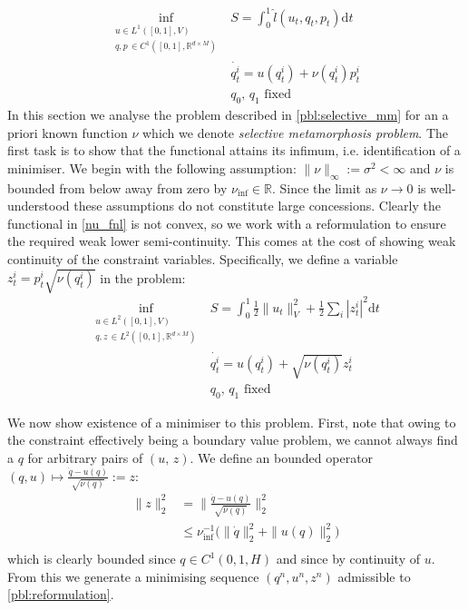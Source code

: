 \documentclass[runningheads]{llncs}
\newcommand{\half}{\frac 12}
\newcommand{\norm}[2]{\| #1 \|_{ #2 }}
\newcommand{\vnorm}[1]{\norm{ #1 }{V}}
\newcommand{\ltwonorm}[1]{\norm{ #1 }{2}}
\newcommand{\diff}[1]{\text{d} #1}
\newcommand{\RdM}{\mathbb{R}^{d\times M}}
\newcommand{\nuinf}{\nu_\text{inf}}
\begin{document}
\begin{align}
\inf_{\substack{u \in L^1([0,1],V)\\ q, p\, \in C^1([0,1],\RdM)}} & S = \int_0^1 \hat l(u_t, q_t, p_t)\diff{t}\label{nu_fnl}\\
& \dot{q_t^i} =  u(q_t^i) + \nu(q^i_t)p^i_t \\
    & q_0,\,q_1\text{ fixed}
  \label{pbl:selective_mm}
\end{align}
In this section we analyse the problem described in \eqref{pbl:selective_mm} for
an a priori known function $\nu$ which we denote \emph{selective metamorphosis
problem}. The first task is to show that the functional attains its infimum,
i.e. identification of a minimiser. We begin with the following assumption:
$\|\nu\|_\infty := \sigma^2 <\infty$ and $\nu$ is bounded from below
away from zero by $\nuinf \in \mathbb R$.
  \label{assumption:nu_bounded}
Since the limit as $\nu\rightarrow 0$ is well-understood these assumptions do
not constitute large concessions. Clearly the functional in \eqref{nu_fnl} is
not convex, so we work with a reformulation to ensure the required weak lower
semi-continuity. This comes at the cost of showing weak continuity of the
constraint variables. Specifically, we define a variable $z^i_t = p^i_t
\sqrt{\nu(q_t^i)}$ in the problem:
\begin{align}
\inf_{\substack{u \in L^2([0,1],V)\\ q, z\, \in L^2([0,1],\RdM)}}
    & S = \int_0^1 \half\vnorm{u_t}^2 + \half\sum_i |z_t^i|^2 \diff{t}\\
    & \dot{q_t^i} = u(q_t^i) + \sqrt{\nu(q_t^i)} z^i_t\\
    & q_0,\,q_1\text{ fixed}
  \label{pbl:reformulation}
\end{align}

We now show existence of a minimiser to this problem. First, note that owing to
the constraint effectively being a boundary value problem, we cannot always find
a $q$ for arbitrary pairs of $(u,\,z)$. We define an bounded operator $(q,u)\mapsto
\frac{\dot{q} - u(q)}{\sqrt{\nu(q)}} := z$:
\begin{align*}
\ltwonorm{z}^2 & = \ltwonorm{\frac{\dot{q} - u(q)}{\sqrt{\nu(q)}}}^2\\
& \leq \nuinf^{-1}\Big(\ltwonorm{\dot{q}}^2 + \ltwonorm{u(q)}^2\Big)\\
\end{align*}
which is clearly bounded since $q\in C^1(0,1,H)$ and since by continuity of $u$.
From this we generate a minimising sequence $(q^n, u^n, z^n)$ admissible to
\eqref{pbl:reformulation}.\\
\end{document}
